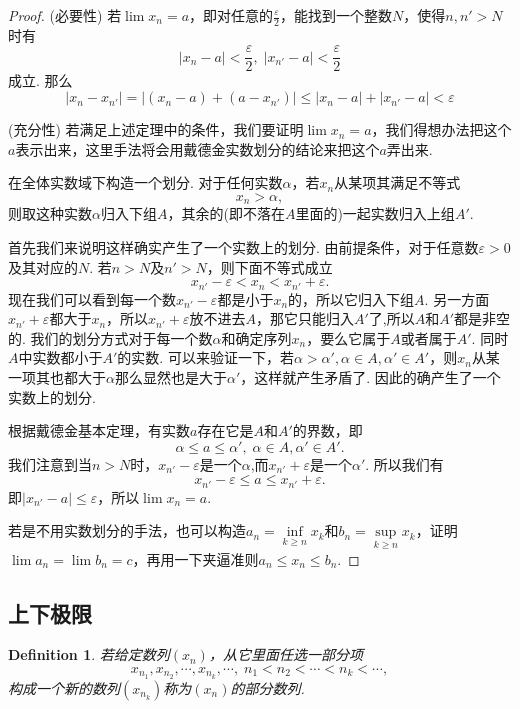 \documentclass{article}
\newtheorem{definition}[theorem]{Definition}
\begin{document}
\begin{proof}
{\color{red} (必要性)} 若$\lim x_n = a$，即对任意的$\frac{\varepsilon}{2}$，能找到一个整数$N$，使得$n, n' > N$时有
$$
|x_n - a| < \frac{\varepsilon}{2},\; |x_{n'} - a| < \frac{\varepsilon}{2}
$$
成立. 那么
$$
|x_n - x_{n'}| = |(x_n -a ) + (a - x_{n'})| \leq |x_n-a| + |x_{n'}-a| < \varepsilon
$$

{\color{red} (充分性)} 若满足上述定理中的条件，{\color{blue}我们要证明$\lim x_n = a$，我们得想办法把这个$a$表示出来，这里手法将会用戴德金实数划分的结论来把这个$a$弄出来}.

在全体实数域下构造一个划分. 对于任何实数$\alpha$，若$x_n$从某项其满足不等式\[x_n > \alpha,\]则取这种实数$\alpha$归入下组$A$，其余的(即不落在$A$里面的)一起实数归入上组$A'$.

首先我们来说明这样确实产生了一个实数上的划分. 由前提条件，对于任意数$\varepsilon>0$及其对应的$N$. 若$n > N$及$n' > N$，则下面不等式成立\[x_{n'} - \varepsilon < x_n < x_{n'}+\varepsilon.\]现在我们可以看到每一个数$x_{n'} - \varepsilon$都是小于$x_n$的，所以它归入下组$A$. 另一方面$x_{n'}+\varepsilon$都大于$x_n$，所以$x_{n'}+\varepsilon$放不进去$A$，那它只能归入$A'$了,所以$A$和$A'$都是非空的. 我们的划分方式对于每一个数$\alpha$和确定序列$x_n$，要么它属于$A$或者属于$A'$. 同时$A$中实数都小于$A'$的实数. 可以来验证一下，若$\alpha > \alpha', \alpha \in A , \alpha' \in A'$，则$x_n$从某一项其也都大于$\alpha$那么显然也是大于$\alpha'$，这样就产生矛盾了. 因此的确产生了一个实数上的划分.

根据戴德金基本定理，有实数$a$存在它是$A$和$A'$的界数，即\[\alpha \leq a \leq \alpha', \; \alpha \in A,\alpha' \in A'.\]我们注意到当$n > N$时，$x_{n'} - \varepsilon$是一个$\alpha$,而$x_{n'} +\varepsilon$是一个$\alpha'$. 所以我们有\[x_{n'} - \varepsilon \leq a \leq x_{n'} + \varepsilon.\]即$|x_{n'}-a| \leq \varepsilon$，所以$\lim x_n = a$.

{\color{blue} 若是不用实数划分的手法，也可以构造$a_n = \inf\limits_{k \geq n} x_k$和$b_n=\sup\limits_{k \geq n} x_k$，证明$\lim a_n = \lim b_n = c$，再用一下夹逼准则$a_n \leq x_n \leq b_n$.}
\end{proof}

\subsection{上下极限}

\begin{definition}
\rm 若给定数列$(x_n)$，从它里面任选一部分项
$$
x_{n_1},x_{n_2},\cdots,x_{n_k},\cdots,\; n_1 < n_2 < \cdots < n_k < \cdots,
$$
构成一个新的数列$(x_{n_k})$称为$(x_n)$的部分数列.
\end{definition}
\end{document}
